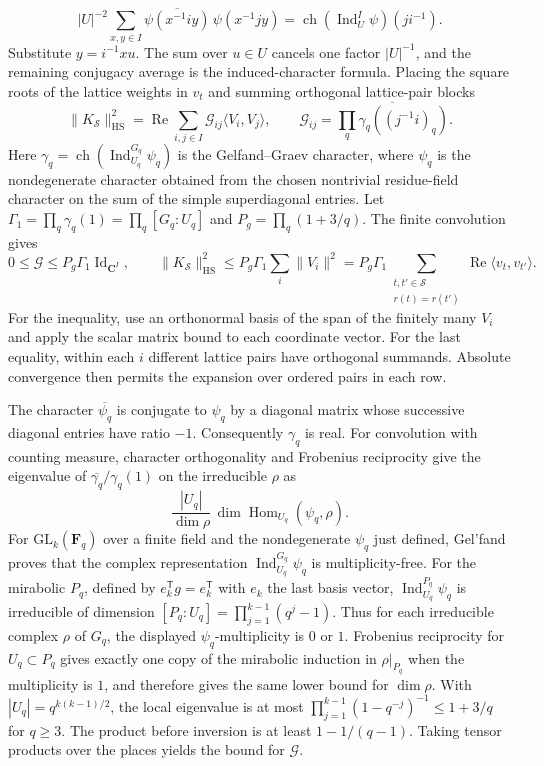 \[
 |U|^{-2}\sum_{x,y\in I}
    \overline{\psi(x^{-1}iy)}\,\psi(x^{-1}jy)
     =\operatorname{ch}(\operatorname{Ind}_U^I\psi)(ji^{-1}).
\]
Substitute \(y=i^{-1}xu\). The sum over \(u\in U\) cancels one
factor \(|U|^{-1}\), and the remaining conjugacy average is the
induced-character formula. Placing the square roots of the lattice
weights in \(v_t\) and summing orthogonal lattice-pair blocks
\[
  \|K_{\mathcal S}\|_{\mathrm{HS}}^2
    =\operatorname{Re}\sum_{i,j\in I}\mathcal G_{ij}\langle V_i,V_j\rangle,
  \qquad
  \mathcal G_{ij}=\overline{\prod_q\gamma_q((j^{-1}i)_q)}.
\]
Here \(\gamma_q=\operatorname{ch}(\operatorname{Ind}_{U_q}^{G_q}\psi_q)\)
is the Gelfand--Graev character,
where \(\psi_q\) is the nondegenerate character obtained from the
chosen nontrivial residue-field character on the sum of the simple
superdiagonal entries. Let \(\Gamma_1=\prod_q\gamma_q(1)=\prod_q[G_q:U_q]\)
and \(P_g=\prod_q(1+3/q)\).
The finite convolution gives
\[
  0\le\mathcal G\le P_g\Gamma_1\operatorname{Id}_{\mathbf C^I},\qquad
  \|K_{\mathcal S}\|_{\mathrm{HS}}^2
  \le P_g\Gamma_1\sum_i\|V_i\|^2
  =P_g\Gamma_1\!
     \sum_{\substack{t,t'\in\mathcal S\\r(t)=r(t')}}
          \operatorname{Re}\langle v_t,v_{t'}\rangle.
\]
For the inequality, use an orthonormal basis of the span of the
finitely many \(V_i\) and apply the scalar matrix bound to each
coordinate vector. For the last equality, within each \(i\) different
lattice pairs have orthogonal summands. Absolute convergence then
permits the expansion over ordered pairs in each row.

The character \(\overline{\psi_q}\) is conjugate to \(\psi_q\) by a
diagonal matrix whose successive diagonal entries have ratio \(-1\).
Consequently \(\gamma_q\) is real. For convolution with counting
measure, character orthogonality and
Frobenius reciprocity give the eigenvalue of
\(\overline{\gamma_q}/\gamma_q(1)\) on the irreducible \(\rho\) as
\[
  \frac{|U_q|}{\dim\rho}\,
        \dim\operatorname{Hom}_{U_q}(\psi_q,\rho).
\]
For \(\mathrm{GL}_k(\mathbf F_q)\) over a finite field and the
nondegenerate \(\psi_q\) just defined, Gel'fand proves that the complex
representation \(\operatorname{Ind}_{U_q}^{G_q}\psi_q\) is
multiplicity-free. For the mirabolic \(P_q\), defined by
\(e_k^{\mathsf T}g=e_k^{\mathsf T}\) with \(e_k\) the last basis vector,
\(\operatorname{Ind}_{U_q}^{P_q}\psi_q\) is irreducible of
dimension \([P_q:U_q]=\prod_{j=1}^{k-1}(q^j-1)\).
Thus for each irreducible complex \(\rho\) of \(G_q\), the displayed
\(\psi_q\)-multiplicity is \(0\) or \(1\). Frobenius reciprocity for
\(U_q\subset P_q\) gives exactly one copy of the mirabolic induction
in \(\rho|_{P_q}\) when the multiplicity is \(1\), and therefore gives
the same lower bound for \(\dim\rho\).
\cite[Theorem~0.5 and Proposition~1.2, pp.~17--18]{tr3gelfand}
With \(|U_q|=q^{k(k-1)/2}\), the local eigenvalue
is at most \(\prod_{j=1}^{k-1}(1-q^{-j})^{-1}\le 1+3/q\) for \(q\ge3\).
The product before inversion is at least \(1-1/(q-1)\).
Taking tensor products over the places yields the bound for \(\mathcal G\).

